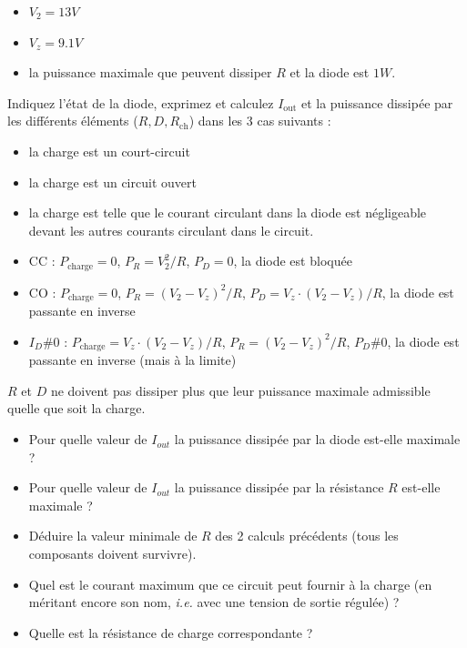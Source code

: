 \documentclass{../template/labo}
\begin{document}
\begin{itemize}
\item $V_2 = 13V$
\item $V_z = 9.1V$
\item la puissance maximale que peuvent dissiper $R$ et la diode est $1W$.
\end{itemize}
\Question
{
	Indiquez l'état de la diode, exprimez et calculez $I_{\mbox{out}}$ et la puissance dissipée par les différents éléments ($R, D, R_{\mbox{ch}}$) dans les 3 cas suivants :
	\begin{itemize}
	\item la charge est un court-circuit
	\item la charge est un circuit ouvert
	\item la charge est telle que le courant circulant dans la diode est négligeable devant les autres courants circulant dans le circuit.
	\end{itemize}
}
{
	\begin{itemize}
		\item CC : $P_{\mbox{charge}}=0$, $P_R=V_2^2/R$, $P_D=0$, la diode est bloquée
		\item CO :  $P_{\mbox{charge}}=0$, $P_R=\left(V_2-V_z\right)^2/R$, $P_D=V_z\cdot \left(V_2-V_z\right)/R$, la diode est passante en inverse
		\item $I_D\#0$ : $P_{\mbox{charge}}=V_z\cdot \left(V_2-V_z\right)/R$, $P_R=\left(V_2-V_z\right)^2/R$, $P_D\#0$, la diode est passante en inverse (mais à la limite)
		\end{itemize}	
	}%
	\label{Q:22}

\Question
{
	$R$ et $D$ ne doivent pas dissiper plus que leur puissance maximale admissible quelle que soit la charge. %
	\begin{itemize}
	\item Pour quelle valeur de $I_{out}$ la puissance dissipée par la diode est-elle maximale ?
	\item Pour quelle valeur de $I_{out}$ la puissance dissipée par la résistance $R$ est-elle maximale ? 
	\item Déduire la valeur minimale de $R$ des 2 calculs précédents (tous les composants doivent survivre).
	\item Quel est le courant maximum que ce circuit peut fournir à la charge (en méritant encore son nom, \textit{i.e.} avec une tension de sortie régulée) ?
	\item Quelle est la résistance de charge correspondante ?
	\end{itemize}
}
{}%
	\label{Q:23}
\end{document}
